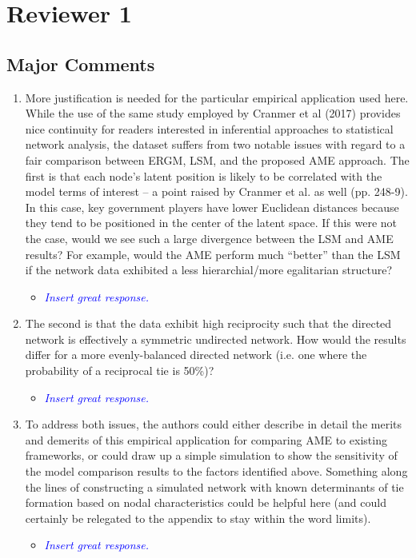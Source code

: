 \section{Reviewer 1}

\subsection{Major Comments}

\begin{enumerate}
	\item  More justification is needed for the particular empirical application used here. While the use of the same study employed by Cranmer et al (2017) provides nice continuity for readers interested in inferential approaches to statistical network analysis, the dataset suffers from two notable issues with regard to a fair comparison between ERGM, LSM, and the proposed AME approach. The first is that each node’s latent position is likely to be correlated with the model terms of interest – a point raised by Cranmer et al. as well (pp. 248-9). In this case, key government players have lower Euclidean distances because they tend to be positioned in the center of the latent space. If this were not the case, would we see such a large divergence between the LSM and AME results? For example, would the AME perform much ``better'' than the LSM if the network data exhibited a less hierarchial/more egalitarian structure? 
	\begin{itemize}
		\item \textcolor{blue}{ \emph{
		Insert great response.
		}}
	\end{itemize}
	\item The second is that the data exhibit high reciprocity such that the directed network is effectively a symmetric undirected network. How would the results differ for a more evenly-balanced directed network (i.e. one where the probability of a reciprocal tie is 50\%)? 
	\begin{itemize}
		\item \textcolor{blue}{ \emph{
		Insert great response.
		}}
	\end{itemize}
	\item To address both issues, the authors could either describe in detail the merits and demerits of this empirical application for comparing AME to existing frameworks, or could draw up a simple simulation to show the sensitivity of the model comparison results to the factors identified above. Something along the lines of constructing a simulated network with known determinants of tie formation based on nodal characteristics could be helpful here (and could certainly be relegated to the appendix to stay within the word limits). 
	\begin{itemize}
		\item \textcolor{blue}{ \emph{
		Insert great response.
		}}
	\end{itemize}	
\end{enumerate}

